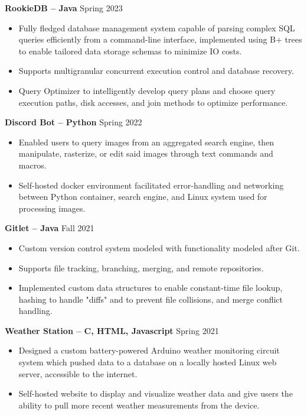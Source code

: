 \documentclass{article}
\begin{document}
    \begin{adjustwidth}{1em}{1em}
        \textbf{RookieDB -- Java} \hfill Spring 2023
        \begin{itemize}
            \item Fully fledged database management system capable of parsing complex SQL queries efficiently from a command-line interface, implemented using B+ trees to enable tailored data storage schemas to minimize IO costs.
            \item Supports multigranular concurrent execution control and database recovery.
            \item Query Optimizer to intelligently develop query plans and choose query execution paths, disk accesses, and join methods to optimize performance.
        \end{itemize}

        \vspace{1mm}

        \textbf{Discord Bot -- Python} \hfill Spring 2022
        \begin{itemize}
            \item Enabled users to query images from an aggregated search engine, then manipulate, rasterize, or edit said images through text commands and macros.
            \item Self-hosted docker environment facilitated error-handling and networking between Python container, search engine, and Linux system used for processing images.
        \end{itemize}

        \textbf{Gitlet -- Java} \hfill Fall 2021 
        \begin{itemize}
            \item Custom version control system modeled with functionality modeled after Git.
            \item Supports file tracking, branching, merging, and remote repositories.
            \item Implemented custom data structures to enable constant-time file lookup, hashing to handle "diffs" and to prevent file collisions, and merge conflict handling.
        \end{itemize}

        \vspace{1mm}

        \noindent \textbf{Weather Station -- C, HTML, Javascript} \hfill Spring 2021
        \begin{itemize}
            \item Designed a custom battery-powered Arduino weather monitoring circuit system which pushed data to a database on a locally hosted Linux web server, accessible to the internet. 
            \item Self-hosted website to display and visualize weather data and give users the ability to pull more recent weather measurements from the device.
        \end{itemize}

        
    \end{adjustwidth}
\end{document}
